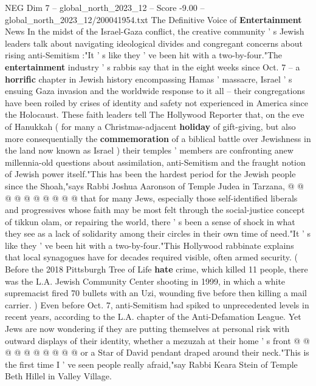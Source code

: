 \begin{textsample}{NEG Dim 7 – global\_north\_2023\_12 – Score -9.00 – global\_north\_2023\_12/200041954.txt}  \label{ex:f7_neg_143}
The Definitive Voice of \textbf{Entertainment} News In the midst of the Israel-Gaza conflict, the creative community ' s Jewish leaders talk about navigating ideological divides and congregant concerns about rising anti-Semitism :"It ' s like they ' ve been hit with a two-by-four."The \textbf{entertainment} industry ' s rabbis say that in the eight weeks since Oct. 7 -- a \textbf{horrific} chapter in Jewish history encompassing Hamas ' massacre, Israel ' s ensuing Gaza invasion and the worldwide response to it all -- their congregations have been roiled by crises of identity and safety not experienced in America since the Holocaust.
These faith leaders tell The Hollywood Reporter that, on the eve of Hanukkah ( for many a Christmas-adjacent \textbf{holiday} of gift-giving, but also more consequentially the \textbf{commemoration} of a biblical battle over Jewishness in the land now known as Israel ) their temples ' members are confronting anew millennia-old questions about assimilation, anti-Semitism and the fraught notion of Jewish power itself."This has been the hardest period for the Jewish people since the Shoah,"says Rabbi Joshua Aaronson of Temple Judea in Tarzana, @ @ @ @ @ @ @ @ @ @ that for many Jews, especially those self-identified liberals and progressives whose faith may be most felt through the social-justice concept of tikkun olam, or repairing the world, there ' s been a sense of shock in what they see as a lack of solidarity among their circles in their own time of need."It ' s like they ' ve been hit with a two-by-four."This Hollywood rabbinate explains that local synagogues have for decades required visible, often armed security. ( Before the 2018 Pittsburgh Tree of Life \textbf{hate} crime, which killed 11 people, there was the L.A.
Jewish Community Center shooting in 1999, in which a white supremacist fired 70 bullets with an Uzi, wounding five before then killing a mail carrier. ) Even before Oct. 7, anti-Semitism had spiked to unprecedented levels in recent years, according to the L.A. chapter of the Anti-Defamation League.
Yet Jews are now wondering if they are putting themselves at personal risk with outward displays of their identity, whether a mezuzah at their home ' s front @ @ @ @ @ @ @ @ @ @ or a Star of David pendant draped around their neck."This is the first time I ' ve seen people really afraid,"say Rabbi Keara Stein of Temple Beth Hillel in Valley Village.

\end{textsample}
